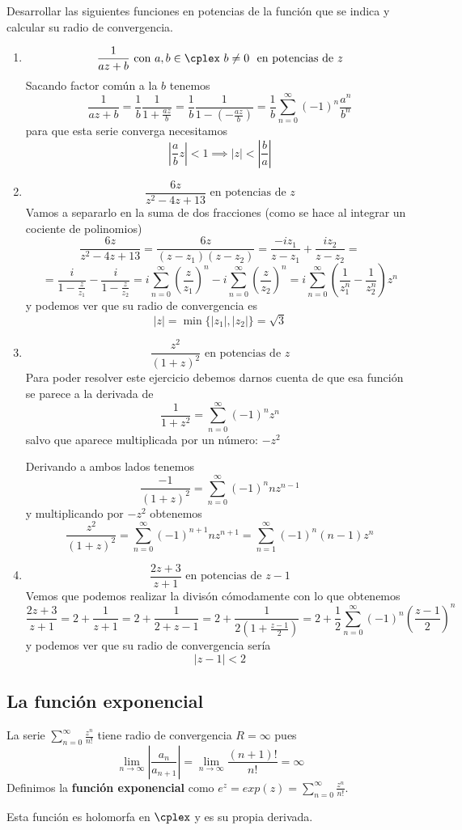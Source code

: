 \documentclass{apuntes}
\begin{document}
\begin{example}
Desarrollar las siguientes funciones en potencias de la función que se indica y calcular su radio de convergencia.
\begin{enumerate}
\item
\[\frac{1}{az+b} \text{ con } a,b \in \cplex \ b \neq 0 \ \text{ en potencias de } z\]
Sacando factor común a la $b$ tenemos
\[\frac{1}{az+b} =  \frac{1}{b} \frac{1}{1+\frac{az}{b}} = \frac{1}{b}\frac{1}{1-\left(-\frac{az}{b}\right)} = \frac{1}{b}\sum_{n=0}^{\infty}(-1)^n\frac{a^n}{b^n}\]
para que esta serie converga necesitamos
\[\left| \frac{a}{b}z\right| < 1 \implies |z| < \left| \frac{b}{a} \right|\]

\item
\[\frac{6z}{z^2-4z+13} \text{ en potencias de } z\]
Vamos a separarlo en la suma de dos fracciones (como se hace al integrar un cociente de polinomios)
\[\frac{6z}{z^2-4z+13} = \frac{6z}{(z-z_1)(z-z_2)} = \frac{-iz_1}{z-z_1} + \frac{iz_2}{z-z_2} = \]
\[= \frac{i}{1-\frac{z}{z_1}} - \frac{i}{1-\frac{z}{z_2}} = i\sum_{n=0}^{\infty}\left(\frac{z}{z_1}\right)^n - i\sum_{n=0}^{\infty}\left(\frac{z}{z_2}\right)^n = i\sum_{n=0}^{\infty}\left( \frac{1}{z_1^n}-\frac{1}{z_2^n}\right)z^n\]
y podemos ver que su radio de convergencia es
\[|z| = \min \{|z_1|, |z_2|\}= \sqrt{3}\]

\item
\[\frac{z^2}{(1+z)^2} \text{ en potencias de } z\]
Para poder resolver este ejercicio debemos darnos cuenta de que esa función se parece a la derivada de
\[\frac{1}{1+z^2} = \sum_{n=0}^{\infty}(-1)^n z^n\]
salvo que aparece multiplicada por un número: $-z^2$

Derivando a ambos lados tenemos
\[\frac{-1}{(1+z)^2}=\sum_{n=0}^{\infty}(-1)^nnz^{n-1}\]
y multiplicando por $-z^2$ obtenemos
\[\frac{z^2}{(1+z)^2} = \sum_{n=0}^{\infty}(-1)^{n+1}nz^{n+1} = \sum_{n=1}^{\infty}(-1)^n(n-1)z^{n}\]

\item
\[\frac{2z+3}{z+1} \text{ en potencias de } z-1\]
Vemos que podemos realizar la divisón cómodamente con lo que obtenemos
\[\frac{2z+3}{z+1}=2+\frac{1}{z+1} = 2 + \frac{1}{2+z-1} = 2 + \frac{1}{2\left( 1+\frac{z-1}{2}\right)} = 2+\frac{1}{2}\sum_{n=0}^{\infty}(-1)^n\left(\frac{z-1}{2} \right)^n\]
y podemos ver que su radio de convergencia sería
\[|z-1| < 2\]

\end{enumerate}
\end{example}

\subsection{La función exponencial}
\begin{defn}
La serie $\sum_{n=0}^{\infty}\frac{z^n}{n!}$ tiene radio de convergencia $R=\infty$ pues
\[\lim_{n \to \infty}\left| \frac{a_n}{a_{n+1}}\right| = \lim_{n \to \infty} \frac{(n+1)!}{n!} = \infty\]
Definimos la \textbf{función exponencial} como $e^z=exp(z)=\sum_{n=0}^{\infty}\frac{z^n}{n!}$.

Esta función es holomorfa en $\cplex$ y es su propia derivada.
\end{defn}
\end{document}
